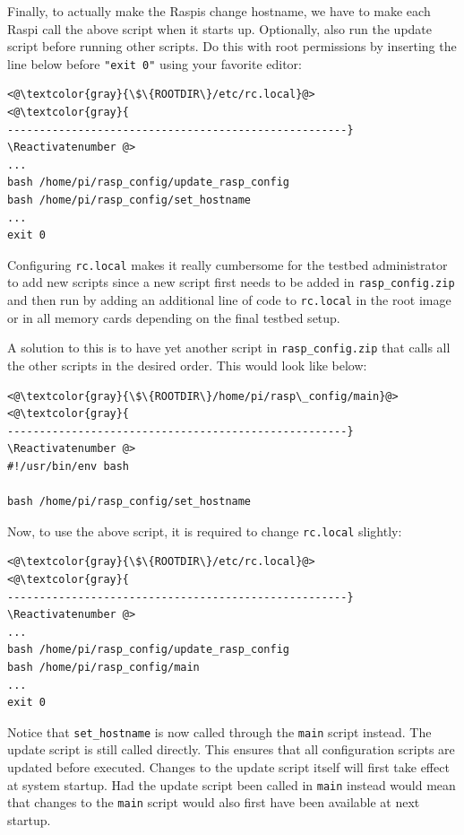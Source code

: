Finally, to actually make the \ac{Raspi}s change hostname, we have to make
each \ac{Raspi} call the above script when it starts up. Optionally,
also run the update script before running other scripts.
Do this with root permissions by inserting the line below before
\texttt{"exit 0"} using your favorite editor:

\Suppressnumber\begin{lstlisting}[]
<@\textcolor{gray}{\$\{ROOTDIR\}/etc/rc.local}@>
<@\textcolor{gray}{
-----------------------------------------------------}
\Reactivatenumber @>
...
bash /home/pi/rasp_config/update_rasp_config
bash /home/pi/rasp_config/set_hostname
...
exit 0
\end{lstlisting}
\FloatBarrier
\vspace{-5mm}

Configuring \texttt{rc.local} makes it really cumbersome for the testbed
administrator to add new scripts since a new script first needs to be added
in \texttt{rasp\_config.zip} and then run by adding an additional line of code
to \texttt{rc.local} in the root image or in all memory cards depending on
the final testbed setup.

A solution to this is to have yet another script in \texttt{rasp\_config.zip}
that calls all the other scripts in the desired order. This would look like
below:
\Suppressnumber\begin{lstlisting}[]
<@\textcolor{gray}{\$\{ROOTDIR\}/home/pi/rasp\_config/main}@>
<@\textcolor{gray}{
-----------------------------------------------------}
\Reactivatenumber @>
#!/usr/bin/env bash

bash /home/pi/rasp_config/set_hostname
\end{lstlisting}
\FloatBarrier
\vspace{-5mm}

Now, to use the above script, it is required to change \texttt{rc.local}
slightly:
\Suppressnumber\begin{lstlisting}[]
<@\textcolor{gray}{\$\{ROOTDIR\}/etc/rc.local}@>
<@\textcolor{gray}{
-----------------------------------------------------}
\Reactivatenumber @>
...
bash /home/pi/rasp_config/update_rasp_config
bash /home/pi/rasp_config/main
...
exit 0
\end{lstlisting}
\FloatBarrier
\vspace{-5mm}
Notice that \texttt{set\_hostname} is now called through the \texttt{main}
script instead. The update script is still called directly. This ensures that
all configuration scripts are updated before executed. Changes to the update
script itself will first take effect at system startup. Had the update script
been called in \texttt{main} instead would mean that changes to the 
\texttt{main} script would also first have been available at next startup.

